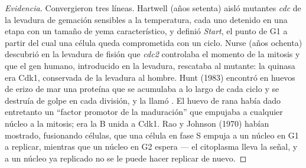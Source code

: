 \begin{proof}[Evidencia]
Convergieron tres líneas. Hartwell (años setenta) aisló mutantes
\emph{cdc} de la levadura de gemación sensibles a la temperatura, cada
uno detenido en una etapa con un tamaño de yema característico, y definió
\emph{Start}, el punto de G1 a partir del cual una célula queda
comprometida con un ciclo. Nurse (años ochenta) descubrió en la levadura
de fisión que \emph{cdc2} controlaba el momento de la mitosis y que el
gen humano, introducido en la levadura, rescataba al mutante: la quinasa
era Cdk1, conservada de la levadura al hombre. Hunt (1983) encontró en
huevos de erizo de mar una proteína que se acumulaba a lo largo de cada
ciclo y se destruía de golpe en cada división, y la llamó . El
huevo de rana había dado entretanto un ``factor promotor de la
maduración'' que empujaba a cualquier núcleo a la mitosis; era la 
B unida a Cdk1. Rao y Johnson (1970) habían mostrado, fusionando células,
que una célula en fase S empuja a un núcleo en G1 a replicar, mientras
que un núcleo en G2 espera --- el citoplasma lleva la señal, y a un
núcleo ya replicado no se le puede hacer replicar de nuevo.
\end{proof}

